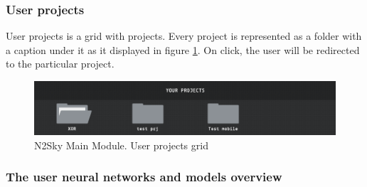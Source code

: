 \subsubsection{User projects}

User projects is a grid with projects. Every project is represented as a folder with a caption under it as it displayed in figure \ref{fig:n2sky_dashboard_projects}. On click, the user will be redirected to the particular project. 

\begin{figure}[htbp]
\begin{center}
  \includegraphics[scale=0.5]{components/5/img/n2sky_dashboard_projects.png}
  \caption{N2Sky Main Module. User projects grid}
  \label{fig:n2sky_dashboard_projects}
\end{center}
\end{figure}

 \subsubsection{The user neural networks and models overview}
 
